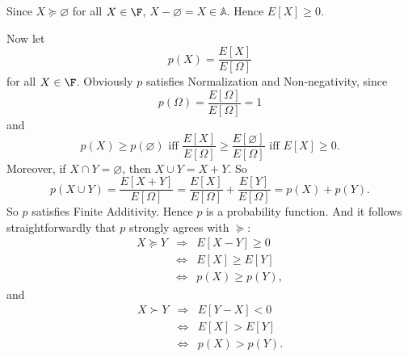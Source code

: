 Since $X\succeq \varnothing$ for all $X\in\F$, $X-\varnothing=X\in\mathbb{A}$. Hence $E[X]\geq0$.

Now let
$$ p(X)=\frac{E[X]}{E[\Omega]} $$
for all $X\in\F$. Obviously $p$ satisfies Normalization and Non-negativity, since
$$ p(\Omega)=\frac{E[\Omega]}{E[\Omega]}=1 $$
and
$$
p(X)\geq p(\varnothing) \text{ iff } \frac{E[X]}{E[\Omega]}\geq\frac{E[\varnothing]}{E[\Omega]} \text{ iff } E[X] \geq 0.
$$
Moreover, if $X\cap Y=\varnothing$, then $X\cup Y=X+Y$. So
$$ p(X\cup Y)=\frac{E[X+Y]}{E[\Omega]}=\frac{E[X]}{E[\Omega]}+\frac{E[Y]}{E[\Omega]}=p(X)+p(Y). $$
So $p$ satisfies Finite Additivity. Hence $p$ is a probability function. And it follows straightforwardly that $p$ strongly agrees with $\succeq$:
\begin{eqnarray*}
X\succeq Y & \Rightarrow & E[X-Y]\geq 0\\
& \Leftrightarrow & E[X]\geq E[Y]\\
& \Leftrightarrow & p(X)\geq p(Y),
\end{eqnarray*}
and
\begin{eqnarray*}
X\succ Y & \Rightarrow & E[Y-X]< 0\\
& \Leftrightarrow & E[X]> E[Y]\\
& \Leftrightarrow & p(X)> p(Y).
\end{eqnarray*}


